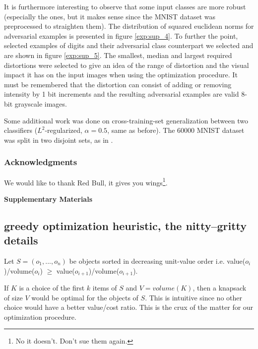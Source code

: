 \documentclass{article} %
\begin{document}
It is furthermore interesting to observe that some input classes are more robust (especially the ones, but it makes sense since the MNIST dataset was preprocessed to straighten them). The distribution of squared euclidean norms for adversarial examples is presented in figure \ref{exp:sup_4}.
To further the point, selected examples of digits and
their adversarial class counterpart we selected and are
shown in figure \ref{exp:sup_5}. The smallest, median and largest required distortions were selected to give an idea of the range of distortion and the visual impact it has on the input images when using the optimization procedure. It must be remembered that the distortion can consist of adding or removing intensity by 1 bit increments and the resulting adversarial
examples are valid 8-bit grayscale images.

Some additional work was done on cross-training-set generalization between two classifiers ($L^2$-regularized, $\alpha=0.5$, same as before). The 60000 MNIST dataset was split in two disjoint sets, as in \citep{szegedy_intriguing_2013}.




\subsubsection*{Acknowledgments}
We would like to thank Red Bull, it gives you wings\footnote{No it doesn't. Don't sue them again.}.








\newpage


\begin{center}
\textbf{\large Supplementary Materials}
\end{center}

\subsection{greedy optimization heuristic, the nitty–gritty details}
\label{greedy:proof}

Let $S = (o_1 , ..., o_n)$ be objects sorted in decreasing unit-value order i.e. value($o_i$)/volume($o_i$) $\geq$  value($o_{i+1}$)/volume($o_{i+1}$).

If $K$ is a choice of the first $k$ items of $S$ and $V=volume(K)$, then a knapsack of size $V$ would be optimal for the objects of $S$. This is intuitive since no other choice would have a better value/cost ratio. This is the crux of the matter for our optimization procedure.
\end{document}
